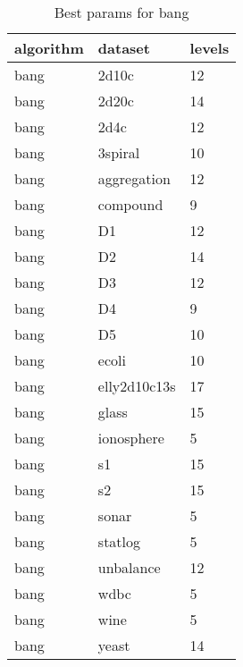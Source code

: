 \begin{table}[H]
\centering
\caption{Best params for bang}
\label{S7_Table}
\begin{tabular}{|l|l|l|}
\hline
algorithm & dataset & levels \\
\hline
bang & 2d10c & 12 \\
\hline
bang & 2d20c & 14 \\
\hline
bang & 2d4c & 12 \\
\hline
bang & 3spiral & 10 \\
\hline
bang & aggregation & 12 \\
\hline
bang & compound & 9 \\
\hline
bang & D1 & 12 \\
\hline
bang & D2 & 14 \\
\hline
bang & D3 & 12 \\
\hline
bang & D4 & 9 \\
\hline
bang & D5 & 10 \\
\hline
bang & ecoli & 10 \\
\hline
bang & elly2d10c13s & 17 \\
\hline
bang & glass & 15 \\
\hline
bang & ionosphere & 5 \\
\hline
bang & s1 & 15 \\
\hline
bang & s2 & 15 \\
\hline
bang & sonar & 5 \\
\hline
bang & statlog & 5 \\
\hline
bang & unbalance & 12 \\
\hline
bang & wdbc & 5 \\
\hline
bang & wine & 5 \\
\hline
bang & yeast & 14 \\
\hline
\end{tabular}
\end{table}

\clearpage

